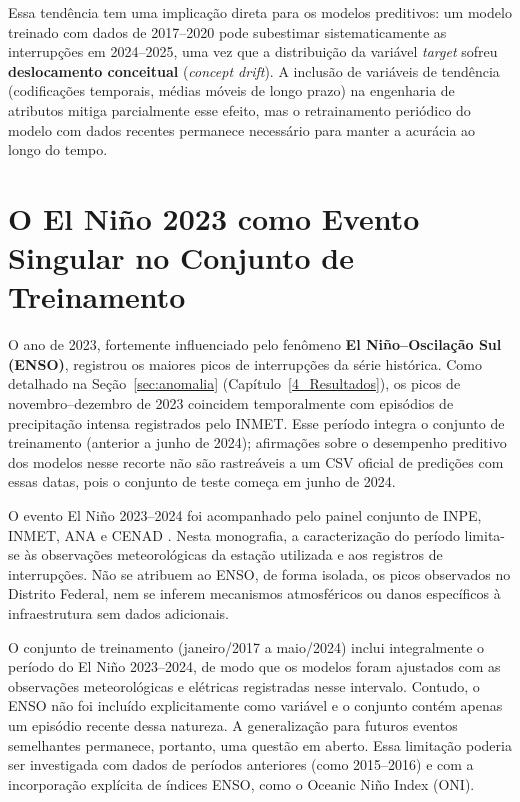 Essa tendência tem uma implicação direta para os modelos preditivos: um modelo treinado com dados de 2017--2020 pode subestimar sistematicamente as interrupções em 2024--2025, uma vez que a distribuição da variável \textit{target} sofreu \textbf{deslocamento conceitual} (\textit{concept drift}). A inclusão de variáveis de tendência (codificações temporais, médias móveis de longo prazo) na engenharia de atributos mitiga parcialmente esse efeito, mas o retrainamento periódico do modelo com dados recentes permanece necessário para manter a acurácia ao longo do tempo.

\section{O El Niño 2023 como Evento Singular no Conjunto de Treinamento}

O ano de 2023, fortemente influenciado pelo fenômeno \textbf{El Niño--Oscilação Sul (ENSO)}, registrou os maiores picos de interrupções da série histórica. Como detalhado na Seção~\ref{sec:anomalia} (Capítulo~\ref{4_Resultados}), os picos de novembro--dezembro de 2023 coincidem temporalmente com episódios de precipitação intensa registrados pelo INMET. Esse período integra o conjunto de treinamento (anterior a junho de 2024); afirmações sobre o desempenho preditivo dos modelos nesse recorte não são rastreáveis a um CSV oficial de predições com essas datas, pois o conjunto de teste começa em junho de 2024.

O evento El Niño 2023--2024 foi acompanhado pelo painel conjunto de INPE, INMET, ANA e CENAD \cite{inpe2023painel}. Nesta monografia, a caracterização do período limita-se às observações meteorológicas da estação utilizada e aos registros de interrupções. Não se atribuem ao ENSO, de forma isolada, os picos observados no Distrito Federal, nem se inferem mecanismos atmosféricos ou danos específicos à infraestrutura sem dados adicionais.

O conjunto de treinamento (janeiro/2017 a maio/2024) inclui integralmente o período do El Niño 2023--2024, de modo que os modelos foram ajustados com as observações meteorológicas e elétricas registradas nesse intervalo. Contudo, o ENSO não foi incluído explicitamente como variável e o conjunto contém apenas um episódio recente dessa natureza. A generalização para futuros eventos semelhantes permanece, portanto, uma questão em aberto. Essa limitação poderia ser investigada com dados de períodos anteriores (como 2015--2016) e com a incorporação explícita de índices ENSO, como o Oceanic Niño Index (ONI).

